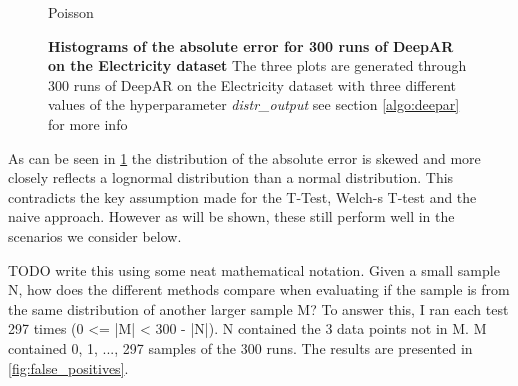 \begin{figure}[htb]
  \caption{Poisson}
  \label{fig:deepar_poisson_distribution}
  \endminipage
  \caption{\textbf{Histograms of the absolute error for 300 runs of DeepAR on the Electricity dataset} The three plots are generated through 300 runs of DeepAR on the Electricity dataset with three different values of the hyperparameter \emph{distr\_output} see section \ref{algo:deepar} for more info }
  \label{fig:deepar_elec_300_hist}
\end{figure}

As can be seen in \ref{fig:deepar_elec_300_hist} the distribution of the absolute error is skewed and more closely reflects a lognormal distribution than a normal distribution. This contradicts the key assumption made for the T-Test, Welch-s T-test and the naive approach. However as will be shown, these still perform well in the scenarios we consider below.

TODO write this using some neat mathematical notation.
Given a small sample N, how does the different methods compare when evaluating if the sample is from the same distribution of another larger sample M? To answer this, I ran each test 297 times (0 <= |M| < 300 - |N|). N contained the 3 data points not in M. M contained {0, 1, ..., 297} samples of the 300 runs.  The results are presented in \ref{fig:false_positives}.

